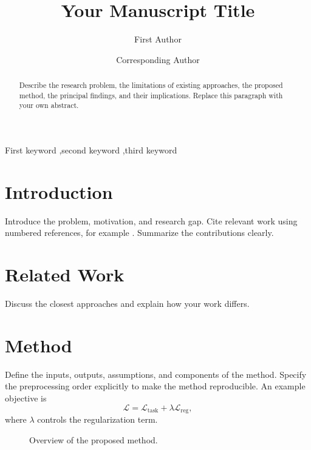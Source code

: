 \documentclass[review,number,sort&compress,nopreprintline]{elsarticle}
\begin{document}
\begin{frontmatter}
\title{Your Manuscript Title}
\author[inst1]{First Author}
\author[inst1]{Corresponding Author\texorpdfstring{}{}}
\begin{abstract}
Describe the research problem, the limitations of existing approaches,
the proposed method, the principal findings, and their implications.
Replace this paragraph with your own abstract.
\end{abstract}
\begin{keyword}
First keyword \sep second keyword \sep third keyword
\end{keyword}
\end{frontmatter}

\section{Introduction}
\linenumbers
\modulolinenumbers[5]
Introduce the problem, motivation, and research gap. Cite relevant work
using numbered references, for example \cite{example-reference}.
Summarize the contributions clearly.

\section{Related Work}
Discuss the closest approaches and explain how your work differs.

\section{Method}
\label{sec:method}
Define the inputs, outputs, assumptions, and components of the method.
Specify the preprocessing order explicitly to make the method reproducible.
An example objective is
\begin{equation}
  \mathcal{L}=\mathcal{L}_{\mathrm{task}}+\lambda\mathcal{L}_{\mathrm{reg}},
  \label{eq:loss}
\end{equation}
where $\lambda$ controls the regularization term.

\begin{figure}[t]
  \centering
  \caption{Overview of the proposed method.}
  \label{fig:overview}
\end{figure}
\end{document}
